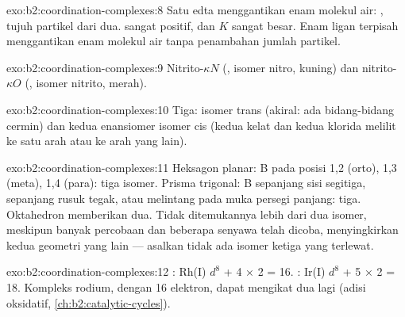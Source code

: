 \begin{solution}{exo:b2:coordination-complexes:8}
Satu edta menggantikan enam molekul air: , tujuh partikel dari dua.  sangat positif, dan $K$
sangat besar. Enam ligan terpisah menggantikan enam molekul air tanpa
penambahan jumlah partikel.
\end{solution}

\begin{solution}{exo:b2:coordination-complexes:9}
Nitrito-$\kappa N$ (, isomer nitro, kuning) dan nitrito-$\kappa O$
(, isomer nitrito, merah).
\end{solution}

\begin{solution}{exo:b2:coordination-complexes:10}
Tiga: isomer trans (akiral: ada bidang-bidang cermin) dan kedua enansiomer
isomer cis (kedua kelat dan kedua klorida melilit ke satu arah atau ke arah
yang lain).
\end{solution}

\begin{solution}{exo:b2:coordination-complexes:11}
Heksagon planar: B pada posisi 1,2 (orto), 1,3 (meta), 1,4 (para): tiga
isomer. Prisma trigonal: B sepanjang sisi segitiga, sepanjang rusuk tegak,
atau melintang pada muka persegi panjang: tiga. Oktahedron memberikan dua.
Tidak ditemukannya lebih dari dua isomer, meskipun banyak percobaan dan
beberapa senyawa telah dicoba, menyingkirkan kedua geometri yang lain ---
asalkan tidak ada isomer ketiga yang terlewat.
\end{solution}

\begin{solution}{exo:b2:coordination-complexes:12}
: Rh(I) $d^8$ + 4 × 2 = 16. : Ir(I) $d^8$ + 5 × 2 =
18. Kompleks rodium, dengan 16 elektron, dapat mengikat dua lagi (adisi
oksidatif, \cref{ch:b2:catalytic-cycles}).
\end{solution}


